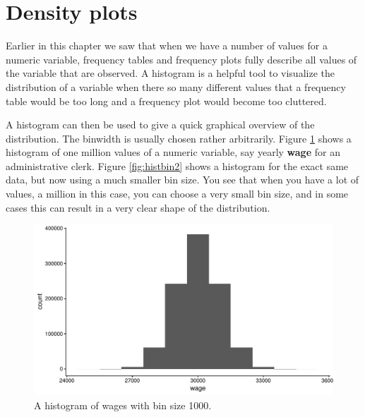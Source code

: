 \documentclass[]{book}\usepackage[]{graphicx}\usepackage[]{color}
\makeatletter
\def\maxwidth{ %
  \ifdim\Gin@nat@width>\linewidth
    \linewidth
  \else
    \Gin@nat@width
  \fi
}
\newenvironment{knitrout}{}{} %
\makeatother
\begin{document}
\section{Density plots}

Earlier in this chapter we saw that when we have a number of values for a numeric variable, frequency tables and frequency plots fully describe all values of the variable that are observed. A histogram is a helpful tool to visualize the distribution of a variable when there so many different values that a frequency table would be too long and a frequency plot would become too cluttered. 


A histogram can then be used to give a quick graphical overview of the distribution. The binwidth is usually chosen rather arbitrarily. Figure \ref{fig:histbin1} shows a histogram of one million values of a numeric variable, say yearly \textbf{wage} for an administrative clerk. Figure \ref{fig:histbin2} shows a histogram for the exact same data, but now using a much smaller bin size. You see that when you have a lot of values, a million in this case, you can choose a very small bin size, and in some cases this can result in a very clear shape of the distribution.

\begin{knitrout}
\color{fgcolor}\begin{figure}

{\centering \includegraphics[width=\maxwidth]{figure/histbin1-1} 

}

\caption[A histogram of wages with bin size 1000]{A histogram of wages with bin size 1000.}\label{fig:histbin1}
\end{figure}


\end{knitrout}
\end{document}
